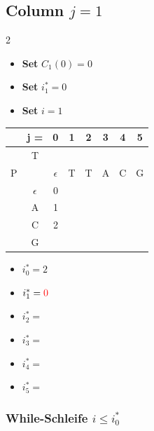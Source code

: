 \subsection*{Column $j = 1$}
\begin{multicols}{2}

    \begin{itemize}
        \item \textbf{Set} $C_1(0) = 0$
        \item \textbf{Set} $i_1^\ast = 0$
        \item \textbf{Set} $i = 1$
    \end{itemize}

    \begin{center}
        \begin{tabular}{|c c|c|c|c|c|c|c|} \hline
        &   j =     &  0            &   1   &   2   &   3   &   4   &   5   \\ \hline
        &   T       &               &       &       &       &       &       \\
        P   &       &  $\epsilon$   &   T   &   T   &   A   &   C   &   G   \\ \hline
        & $\epsilon$&       0       &\ccr0  &       &       &       &       \\ \hline
        &    A      &       1       &       &       &       &       &       \\ \hline
        &    C      &   2           &       &       &       &       &       \\ \hline
        &    G      &               &       &       &       &       &       \\ \hline
        \end{tabular}
    \end{center}
    \columnbreak
    \begin{itemize}
        \item $i_0^\ast = 2$
        \item $i_1^\ast = \textcolor{red}{0} $
        \item $i_2^\ast = $
        \item $i_3^\ast = $
        \item $i_4^\ast = $
        \item $i_5^\ast = $
    \end{itemize}
\end{multicols}

\subsubsection*{While-Schleife $i \le i_{0}^\ast$}

